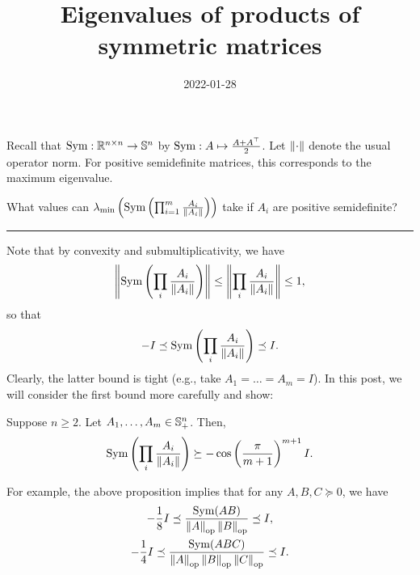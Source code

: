\documentclass{article}
\title{Eigenvalues of products of symmetric matrices}
\date{2022-01-28}
\begin{document}
Recall that $\Sym:\R^{n\by n}\to\S^n$ by $\Sym:A\mapsto \frac{A+A^\top}{2}$. Let $\norm{\cdot}$ denote the usual operator norm. For positive semidefinite matrices, this corresponds to the maximum eigenvalue.

\begin{question}
What values can $\lambda_{\min}\left(\Sym\left(\prod_{i=1}^m \frac{A_i}{\norm{A_i}}\right)\right)$ take if $A_i$ are positive semidefinite?
\end{question}

\rule{0.5\linewidth}{\linethickness}

Note that by convexity and submultiplicativity, we have 
\begin{align*}
\norm{\Sym\left(\prod_i \frac{A_i}{\norm{A_i}}\right)}
\leq \norm{\prod_i \frac{A_i}{\norm{A_i}}} \leq 1,
\end{align*}
so that
\begin{align*}
-I\preceq\Sym\left(\prod_i \frac{A_i}{\norm{A_i}}\right)\preceq I.
\end{align*}
Clearly, the latter bound is tight (e.g., take $A_1= \dots = A_m = I$).
In this post, we will consider the first bound more carefully and show:
\begin{proposition}
Suppose $n\geq 2$.
Let $A_1,\dots,A_m\in\S^n_+$. Then,
\begin{align*}
\Sym\left(\prod_i \frac{A_i}{\norm{A_i}}\right)\succeq - \cos\left(\frac{\pi}{m+1}\right)^{m+1}I.
\end{align*}
\end{proposition}
For example, the above proposition implies that for any $A,B,C\succeq 0$, we have
\begin{gather*}
-\frac{1}{8}I\preceq\frac{\Sym(AB)}{\norm{A}_\textup{op}\norm{B}_\textup{op}} \preceq I,\\
-\frac{1}{4}I\preceq\frac{\Sym(ABC)}{\norm{A}_\textup{op}\norm{B}_\textup{op}\norm{C}_\textup{op}} \preceq I.
\end{gather*}
\end{document}
